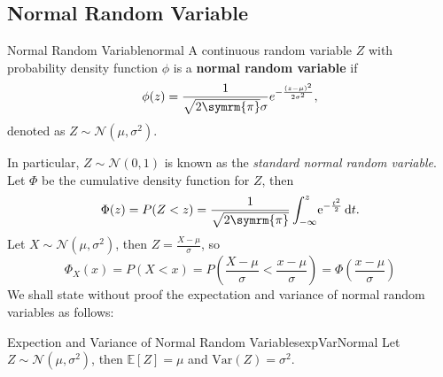 \documentclass[math]{amznotes}
\theoremstyle{remark}
\newcommand{\0}{\mathbf{0}}
\newcommand{\1}{\mathbf{1}}
\begin{document}
\subsection{Normal Random Variable}
\begin{dfnbox}{Normal Random Variable}{normal}
    A continuous random variable $Z$ with probability density function $\phi$ is a {\color{red} \textbf{normal random variable}} if 
    \begin{equation*}
        \phi(z) = \frac{1}{\sqrt{2\symrm{\pi}}\sigma}e^{-\frac{(z - \mu)^2}{2\sigma^2}},
    \end{equation*}
    denoted as $Z \sim \mathcal{N}\left(\mu, \sigma^2\right)$.
\end{dfnbox}
In particular, $Z \sim \mathcal{N}(0, 1)$ is known as the \textit{standard normal random variable}. Let $\Phi$ be the cumulative density function for $Z$, then 
\begin{equation*}
    \Phi(z) = P(Z < z) = \frac{1}{\sqrt{2\symrm{\pi}}}\int_{-\infty}^{z}\!\mathrm{e}^{-\frac{t^2}{2}} \,\mathrm{d}t.
\end{equation*}
Let $X \sim \mathcal{N}(\mu, \sigma^2)$, then $Z = \frac{X - \mu}{\sigma}$, so
\begin{equation*}
    \Phi_X(x) = P\left(X < x\right) = P\left(\frac{X - \mu}{\sigma} < \frac{x - \mu}{\sigma}\right) = \Phi\left(\frac{x - \mu}{\sigma}\right)
\end{equation*}
We shall state without proof the expectation and variance of normal random variables as follows:
\begin{probox}{Expection and Variance of Normal Random Variables}{expVarNormal}
    Let $Z \sim \mathcal{N}(\mu, \sigma^2)$, then $\mathbb{E}[Z] = \mu$ and $\mathrm{Var}(Z) = \sigma^2$.
\end{probox}
\end{document}
